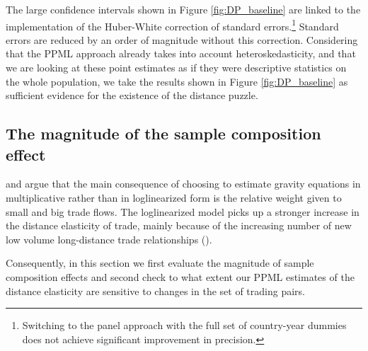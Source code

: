 \documentclass[12pt,twoside,a4paper,notitlepage]{article}
\begin{document}
The large confidence intervals shown in Figure \ref{fig:DP_baseline} are linked to the implementation of the Huber-White correction of standard errors.\footnote{Switching to the panel approach with the full set of country-year dummies does not achieve significant improvement in precision.}
Standard errors are reduced by an order of magnitude without this correction.  
Considering that  the PPML approach already takes into account heteroskedasticity, and that \fi we are looking at these point estimates as if they were descriptive statistics on the whole population, we take the results shown in Figure \ref{fig:DP_baseline} as sufficient evidence for the existence of the distance puzzle. 


\subsection{The magnitude of the sample composition effect} \label{subsec:data}

\cite{Mayer2019} and \cite{Head2013} argue that the main consequence of choosing to estimate gravity equations in multiplicative rather than in loglinearized form is the relative weight given to small and big trade flows. 
The loglinearized model picks up a stronger increase in the distance elasticity of trade, mainly because of the increasing number of new low volume long-distance trade relationships (\cite{Head2013}). 

Consequently, in this section we first evaluate the magnitude of sample composition effects and second check to what extent our PPML estimates of the distance elasticity are sensitive to changes in the set of trading pairs.
\end{document}
